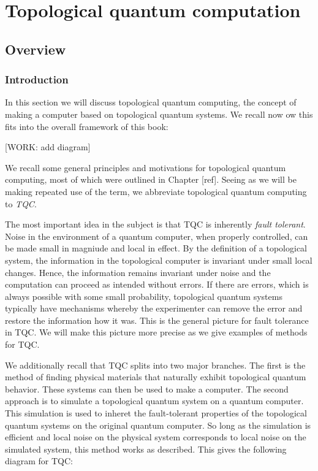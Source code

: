 \section{Topological quantum computation}

\subsection{Overview}

\subsubsection{Introduction}

In this section we will discuss topological quantum computing, the concept of making a computer based on topological quantum systems. We recall now ow this fits into the overall framework of this book:

[WORK: add diagram]

We recall some general principles and motivations for topological quantum computing, most of which were outlined in Chapter [ref]. Seeing as we will be making repeated use of the term, we abbreviate topological quantum computing to \textit{TQC}.

The most important idea in the subject is that TQC is inherently \textit{fault tolerant}. Noise in the environment of a quantum computer, when properly controlled, can be made small in magniude and local in effect. By the definition of a topological system, the information in the topological computer is invariant under small local changes. Hence, the information remains invariant under noise and the computation can proceed as intended without errors. If there are errors, which is always possible with some small probability, topological quantum systems typically have mechanisms whereby the experimenter can remove the error and restore the information how it was. This is the general picture for fault tolerance in TQC. We will make this picture more precise as we give examples of methods for TQC.

We additionally recall that TQC splits into two major branches. The first is the method of finding physical materials that naturally exhibit topological quantum behavior. These systems can then be used to make a computer. The second approach is to simulate a topological quantum system on a quantum computer. This simulation is used to inheret the fault-tolerant properties of the topological quantum systems on the original quantum computer. So long as the simulation is efficient and local noise on the physical system corresponds to local noise on the simulated system, this method works as described. This gives the following diagram for TQC:

